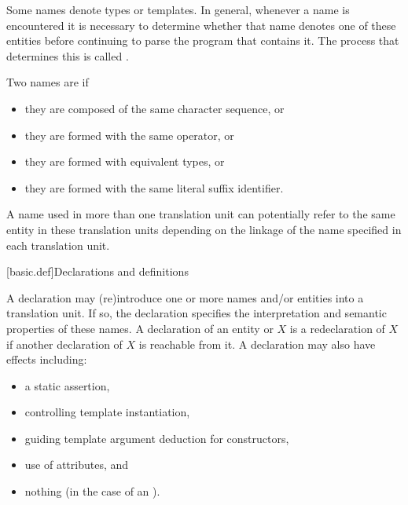 \pnum
Some names denote types or templates. In general,
whenever a name is encountered it is necessary to determine whether that name denotes
one of these entities before continuing to parse the program that contains it. The
process that determines this is called
.

\pnum
Two names are  if
\begin{itemize}
\item they are  composed of the same character sequence, or
\item they are  formed with
the same operator, or
\item they are  formed
with equivalent types, or
\item they are  formed with
the same literal suffix identifier.
\end{itemize}

\pnum
{}%
%
A name used in more than one translation unit can potentially
refer to the same entity in these translation units depending on the
linkage of the name specified in each
translation unit.

[basic.def]{Declarations and definitions}

\pnum
{}%
%
%
A declaration may (re)introduce
one or more names and/or entities into a translation
unit.
If so, the
declaration specifies the interpretation and semantic properties of these names.
A declaration of an entity or  $X$ is
a redeclaration of $X$
if another declaration of $X$ is reachable from it.
A declaration may also have effects including:
\begin{itemize}
\item a static assertion,
\item controlling template instantiation,
\item guiding template argument deduction for constructors,
\item use of attributes, and
\item nothing (in the case of an ).
\end{itemize}

